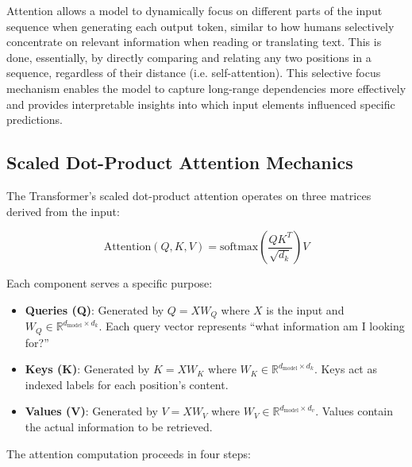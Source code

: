 Attention allows a model to dynamically focus on different parts of the input sequence when generating each output token, similar to how humans selectively concentrate on relevant information when reading or translating text. This is done, essentially, by directly comparing and relating any two positions in a sequence, regardless of their distance (i.e. self-attention). This selective focus mechanism enables the model to capture long-range dependencies more effectively and provides interpretable insights into which input elements influenced specific predictions.

\subsection{Scaled Dot-Product Attention Mechanics}

The Transformer's scaled dot-product attention operates on three matrices derived from the input:

\begin{equation}
\text{Attention}(Q, K, V) = \text{softmax}\left(\frac{QK^T}{\sqrt{d_k}}\right)V
\end{equation}

Each component serves a specific purpose:

\begin{itemize}
   \item \textbf{Queries (Q)}: Generated by $Q = XW_Q$ where $X$ is the input and $W_Q \in \mathbb{R}^{d_{\text{model}} \times d_k}$. Each query vector represents ``what information am I looking for?''
   \item \textbf{Keys (K)}: Generated by $K = XW_K$ where $W_K \in \mathbb{R}^{d_{\text{model}} \times d_k}$. Keys act as indexed labels for each position's content.
   \item \textbf{Values (V)}: Generated by $V = XW_V$ where $W_V \in \mathbb{R}^{d_{\text{model}} \times d_v}$. Values contain the actual information to be retrieved.
\end{itemize}

The attention computation proceeds in four steps:

